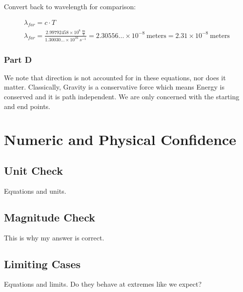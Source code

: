 \documentclass[]{report}
\begin{document}
          Convert back to wavelength for comparison:

          \begin{equation*}
            \begin{split}
              \lambda_{far} = c\cdot T \\
              \lambda_{far} = \frac{2.99792458\times10^8\ \frac{\text{m}}{\text{s}}}{1.30030...\times10^{16}\ s^{-1}} = 2.30556...\times10^{-8}\ \text{meters} = 2.31\times10^{-8}\ \text{meters}
              \end{split}
          \end{equation*}

        \subsubsection{Part D}
          We note that direction is not accounted for in these equations, nor does it matter. Classically, Gravity is a conservative force which means Energy is conserved and it is path independent. We are only concerned with the starting and end points.

    \section{Numeric and Physical Confidence}

      \subsection{Unit Check}
        Equations and units.

      \subsection{Magnitude Check}
        This is why my answer is correct.

      \subsection{Limiting Cases}
        Equations and limits. Do they behave at extremes like we expect?
\end{document}
